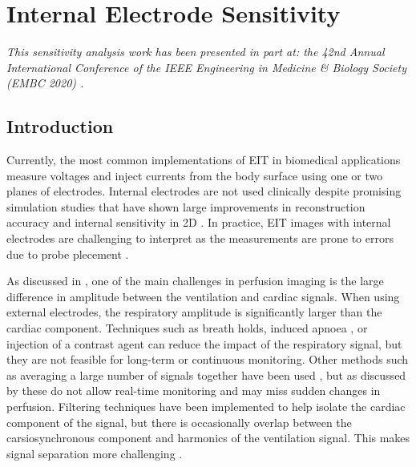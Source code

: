 \chapter{Internal Electrode Sensitivity}
\label{chap:chapter-6}
\emph{This sensitivity analysis work has
 been presented in part at: the 42nd Annual International Conference of the IEEE Engineering 
 in Medicine \& Biology Society (EMBC 2020) \parencite{stowe_effect_2020}.} 

\section{Introduction}
Currently, the most common implementations of EIT in biomedical applications
measure voltages and inject currents from the body surface using 
one or two planes of electrodes. Internal electrodes are not used clinically
despite promising simulation studies that have shown large improvements 
in reconstruction accuracy and internal sensitivity in 
2D \parencite{nasehi_tehrani_evaluation_2012,nasehi_tehrani_modelling_2012}. 
In practice, EIT images with internal electrodes are challenging 
to interpret 
as the measurements are prone to errors 
due to probe 
plecement \parencite{czaplik_application_2014}. 

As discussed in , one of the main challenges 
in perfusion imaging is the large difference in amplitude 
between the ventilation and cardiac signals. 
When using external electrodes, the respiratory amplitude is 
significantly larger than the cardiac component. 
Techniques such as 
breath holds, induced apnoea \parencite{leathard_comparison_1994,stowe_comparison_2019}, 
or injection 
of a contrast agent \parencite{frerichs_regional_2002} can reduce the
impact of the respiratory signal, but they are not feasible for 
long-term or continuous monitoring. 
Other methods such as averaging a large number of signals together 
have been used \parencite{eyuboglu_vivo_1989,vonk-noordegraaf_pulmonary_1998}, 
but as discussed by  
these do not allow real-time monitoring and 
may miss sudden changes in perfusion.
Filtering techniques have been implemented to help isolate the 
cardiac component of the signal, but there is occasionally overlap between 
the carsiosynchronous component and harmonics of the ventilation
signal. This makes signal separation more 
challenging \parencite{zadehkoochak_pulmonary_1992,leathard_comparison_1994}.

